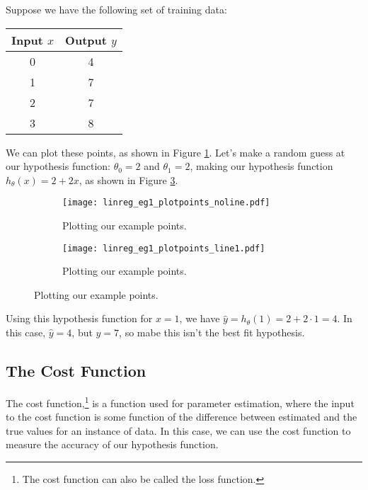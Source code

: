 Suppose we have the following set of training data:

\begin{center}
\begin{tabular}{c | c}
\textbf{Input } $x$ & \textbf{Output } $y$ \\
\hline
0 & 4 \\
1 & 7 \\
2 & 7 \\
3 & 8 \\
\end{tabular}
\end{center}

We can plot these points, as shown in Figure \ref{fig:linregeg-justpoints}. Let's make a random guess at our hypothesis function: $\theta_0  = 2$ and $\theta_1 = 2$, making our hypothesis function $h_\theta\left( x \right) = 2 + 2x$, as shown in Figure \ref{fig:linregeg-hypotguess1}.

\begin{figure}[h]
	\centering
	\begin{subfigure}[t]{0.45\textwidth}
		\centering
		\graphicspath{{./Figures/}}
		\texttt{[image: linreg\_eg1\_plotpoints\_noline.pdf]}
		\caption{Plotting our example points.}
		\label{fig:linregeg-justpoints}
	\end{subfigure}
	\begin{subfigure}[t]{0.45\textwidth}
		\centering
		\graphicspath{{./Figures/}}
		\texttt{[image: linreg\_eg1\_plotpoints\_line1.pdf]}
		\caption{Plotting our example points.}
		\label{fig:linregeg-hypotguess1}
	\end{subfigure}
\end{figure}

Using this hypothesis function for $x = 1$, we have $\hat{y} = h_\theta\left( 1 \right) = 2 + 2 \cdot 1 = 4$. In this case, $\hat{y} = 4$, but $y = 7$, so mabe this isn't the best fit hypothesis.  


\subsection{The Cost Function}
\label{chaplinreg-sectunivar-subsect:costfxn}

The cost function,\footnote{The cost function can also be called the loss function.} is a function used for parameter estimation, where the input to the cost function is some function of the difference between estimated and the true values for an instance of data. In this case, we can use the cost function to measure the accuracy of our hypothesis function. 


